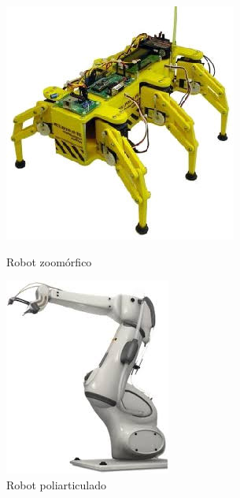\begin{figure}[H]
	\begin{minipage}{0.48\textwidth}
    	\centering
     	\includegraphics[scale=0.6]{img/robot-zoomorfico.jpg}
  		\caption{Robot zoomórfico}
  		\label{fig:zoomorfico}
   	\end{minipage}\hfill
   	\begin {minipage}{0.48\textwidth}
     	\centering
     	\includegraphics[scale=0.6]{img/robot-poliarticulado.jpg}
     	\caption{Robot poliarticulado}
     	\label{fig:poliarticulado}
	\end{minipage}
\end{figure}


